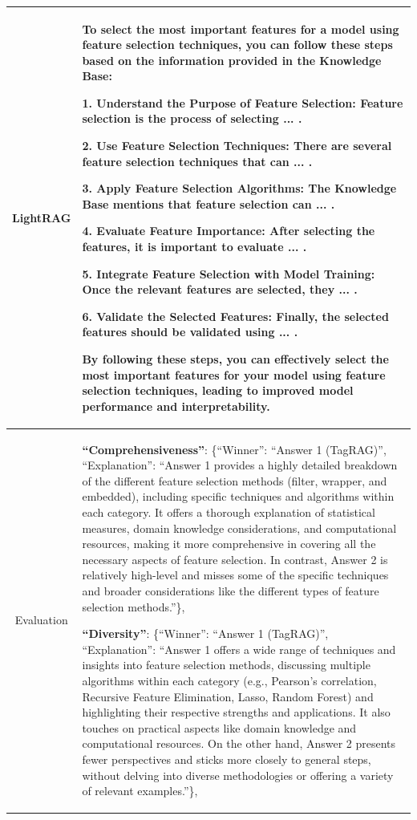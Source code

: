 \documentclass[11pt]{article}
\begin{document}
\begin{table}[h]
\begin{tabularx}{\textwidth}{p{2cm}|X}
    \hline
    
    \multicolumn{1}{c|}{LightRAG} &  To select the most important features for a model using feature selection techniques, you can follow these steps based on the information provided in the Knowledge Base:
    
    1. \textbf{Understand the Purpose of Feature Selection}: Feature selection is the process of selecting ... .
    
    2. \textbf{Use Feature Selection Techniques}: There are several feature selection techniques that can  ... .
    
    3. \textbf{Apply Feature Selection Algorithms}: The Knowledge Base mentions that feature selection can ... .
    
    4. \textbf{Evaluate Feature Importance}: After selecting the features, it is important to evaluate ... .
    
    5. \textbf{Integrate Feature Selection with Model Training}: Once the relevant features are selected, they ... .
    
    6. \textbf{Validate the Selected Features}: Finally, the selected features should be validated using ... .
    
    By following these steps, you can effectively select the most important features for your model using feature selection techniques, leading to improved model performance and interpretability. \\ 
    
    \hline
    
    \multicolumn{1}{c|}{Evaluation} & \textbf{``Comprehensiveness''}: \{``Winner'': ``Answer 1 (TagRAG)'', ``Explanation'': ``Answer 1 provides a highly detailed breakdown of the different feature selection methods (filter, wrapper, and embedded), including specific techniques and algorithms within each category. It offers a thorough explanation of statistical measures, domain knowledge considerations, and computational resources, making it more comprehensive in covering all the necessary aspects of feature selection. In contrast, Answer 2 is relatively high-level and misses some of the specific techniques and broader considerations like the different types of feature selection methods.''\},
    
    \textbf{``Diversity''}: \{``Winner'': ``Answer 1 (TagRAG)'', ``Explanation'': ``Answer 1 offers a wide range of techniques and insights into feature selection methods, discussing multiple algorithms within each category (e.g., Pearson's correlation, Recursive Feature Elimination, Lasso, Random Forest) and highlighting their respective strengths and applications. It also touches on practical aspects like domain knowledge and computational resources. On the other hand, Answer 2 presents fewer perspectives and sticks more closely to general steps, without delving into diverse methodologies or offering a variety of relevant examples.''\},
    

\end{tabularx}
\end{table}
\end{document}
